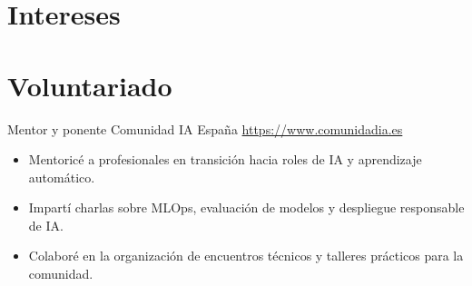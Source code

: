 \documentclass[a4paper, serif, 10pt]{moderncv}
\begin{document}
\section{Intereses}

\section{Voluntariado}

        {Mentor y ponente}
        {Comunidad IA España}
        {\url{https://www.comunidadia.es}}
        {}
        {\begin{itemize}
\item Mentoricé a profesionales en transición hacia roles de IA y aprendizaje automático.
\item Impartí charlas sobre MLOps, evaluación de modelos y despliegue responsable de IA.
\item Colaboré en la organización de encuentros técnicos y talleres prácticos para la comunidad.
\end{itemize}}
    
\end{document}

